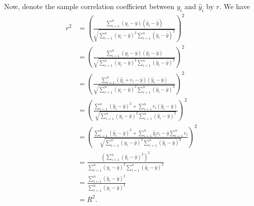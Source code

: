 \documentclass[a4paper,11pt]{article}
\begin{document}
Now, denote the sample correlation coefficient between $y_i$ and $\hat{y}_i$ by $r$. We have
\begin{align*}
    r^2&=\left(\frac{\sum_{i=1}^n(y_i-\bar{y})(\hat{y}_i-\bar{\hat{y}})}{\sqrt{\sum_{i=1}^n(y_i-\bar{y})^2\sum_{i=1}^n(\hat{y}_i-\bar{\hat{y}})^2}}\right)^2\\
    &=\left(\frac{\sum_{i=1}^n(y_i-\bar{y})(\hat{y}_i-\bar{y})}{\sqrt{\sum_{i=1}^n(y_i-\bar{y})^2\sum_{i=1}^n(\hat{y}_i-\bar{y})^2}}\right)^2\\
    &=\left(\frac{\sum_{i=1}^n(\hat{y}_i+e_i-\bar{y})(\hat{y}_i-\bar{y})}{\sqrt{\sum_{i=1}^n(y_i-\bar{y})^2\sum_{i=1}^n(\hat{y}_i-\bar{y})^2}}\right)^2\\
    &=\left(\frac{\sum_{i=1}^n(\hat{y}_i-\bar{y})^2+\sum_{i=1}^ne_i(\hat{y}_i-\bar{y})}{\sqrt{\sum_{i=1}^n(y_i-\bar{y})^2\sum_{i=1}^n(\hat{y}_i-\bar{y})^2}}\right)^2\\
    &=\left(\frac{\sum_{i=1}^n(\hat{y}_i-\bar{y})^2+\sum_{i=1}^n\hat{y}_ie_i-\bar{y}\sum_{i=1}^ne_i}{\sqrt{\sum_{i=1}^n(y_i-\bar{y})^2\sum_{i=1}^n(\hat{y}_i-\bar{y})^2}}\right)^2\\
    &=\frac{\left(\sum_{i=1}^n(\hat{y}_i-\bar{y})^2\right)^2}{\sum_{i=1}^n(y_i-\bar{y})^2\sum_{i=1}^n(\hat{y}_i-\bar{y})^2}\\
    &=\frac{\sum_{i=1}^n(\hat{y}_i-\bar{y})^2}{\sum_{i=1}^n(y_i-\bar{y})^2}\\
    &=R^2.
\end{align*}
\end{document}
